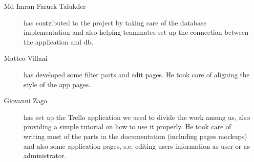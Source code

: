 \begin{description}
    \item[Md Imran Faruck Talukder] has contributed to the project by taking care of the database implementation and also helping teammates set up the connection between the application and db.
    \item[Matteo Villani] has developed some filter parts and edit pages. He took care of aligning the style of the app pages.
    \item[Giovanni Zago] has set up the Trello application we used to divide the work among us, also providing a simple tutorial on how to use it properly. He took care of writing most of the parts in the documentation (including pages mockups) and also some application pages, s.e. editing users information as user or as administrator.
\end{description}